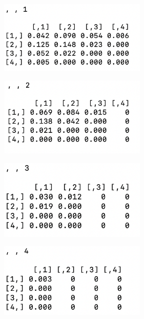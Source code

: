 \documentclass[12pt]{article}
\begin{document}
\begin{figure}
  \begin{subfigure}{8cm}
    \centering
    \includegraphics[width=7cm]{figures/1.png}
    \caption{ }
  \end{subfigure}
  \begin{subfigure}{9cm}
    \centering
    \includegraphics[width=7cm]{figures/2.png}
    \caption{ }
  \end{subfigure}
  \begin{subfigure}{8cm}
    \centering
    \includegraphics[width=7cm]{figures/3.png}
    \caption{ }
  \end{subfigure}
  \begin{subfigure}{9cm}
    \centering
    \includegraphics[width=7cm]{figures/4.png}
    \caption{ }
  \end{subfigure}
\end{figure}

\end{document}

